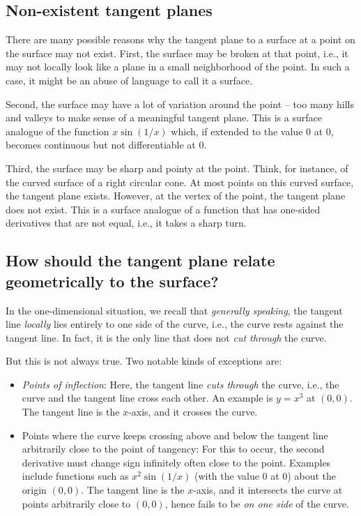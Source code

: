 \documentclass[10pt]{amsart}
\begin{document}
\subsection{Non-existent tangent planes}

There are many possible reasons why the tangent plane to a surface at
a point on the surface may not exist. First, the surface may be broken
at that point, i.e., it may not locally look like a plane in a small
neighborhood of the point. In such a case, it might be an abuse of
language to call it a surface.

Second, the surface may have a lot of variation around the point --
too many hills and valleys to make sense of a meaningful tangent
plane. This is a surface analogue of the function $x\sin(1/x)$ which,
if extended to the value $0$ at $0$, becomes continuous but not
differentiable at $0$.

Third, the surface may be sharp and pointy at the point. Think, for
instance, of the curved surface of a right circular cone. At most
points on this curved surface, the tangent plane exists. However, at
the vertex of the point, the tangent plane does not exist. This is a
surface analogue of a function that has one-sided derivatives that are
not equal, i.e., it takes a sharp turn.

\subsection{How should the tangent plane relate geometrically to the surface?}

In the one-dimensional situation, we recall that {\em generally
speaking}, the tangent line {\em locally} lies entirely to one side of
the curve, i.e., the curve rests against the tangent line. In fact, it
is the only line that does not {\em cut through} the curve.

But this is not always true. Two notable kinds of exceptions are:

\begin{itemize}
\item {\em Points of inflection}: Here, the tangent line {\em cuts
  through} the curve, i.e., the curve and the tangent line cross each
  other. An example is $y = x^3$ at $(0,0)$. The tangent line is the
  $x$-axis, and it crosses the curve.
\item Points where the curve keeps crossing above and below the
  tangent line arbitrarily close to the point of tangency: For this to
  occur, the second derivative must change sign infinitely often close
  to the point. Examples include functions such as $x^2\sin(1/x)$
  (with the value $0$ at $0$) about the origin $(0,0)$. The tangent
  line is the $x$-axis, and it intersects the curve at points
  arbitrarily close to $(0,0)$, hence fails to be {\em on one side} of
  the curve.
\end{itemize}
\end{document}
